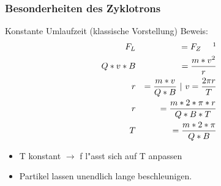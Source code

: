 \documentclass{beamer}
\begin{document}
\begin{frame}
\frametitle{Besonderheiten des Zyklotrons}
  \begin{block} {Konstante Umlaufzeit (klassische Vorstellung)}
    Beweis: \\
    \begin{eqnarray}
      F_L       && = F_Z ~~~~ \footnotemark  \\
      Q * v * B     && = \frac{m * v^2}{r} \\
      r     && = \frac{m * v}{Q * B}  ~ | ~ v = \frac{2\pi r}{T} \\
      r     && = \frac{m * 2 * \pi * r}{Q * B * T} \\
      T     && = \frac{m * 2 * \pi }{Q * B} 
    \end{eqnarray}
    \begin{itemize}
      \item T konstant $\rightarrow$ f l"asst sich auf T anpassen
      \item Partikel lassen unendlich lange beschleunigen.
    \end{itemize}
  \end{block}
\end{frame}
\end{document}
